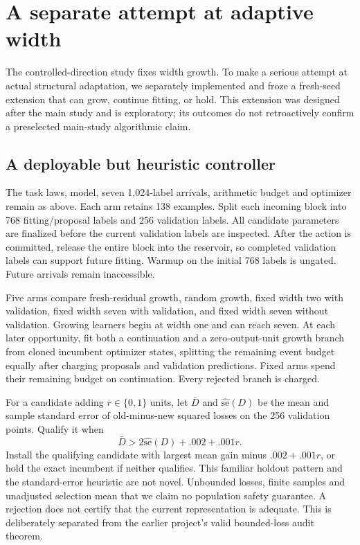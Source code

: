 \section{A separate attempt at adaptive width}
\label{sec:adaptive-extension}

The controlled-direction study fixes width growth. To make a serious attempt
at actual structural adaptation, we separately implemented and froze a
fresh-seed extension that can grow, continue fitting, or hold. This extension
was designed after the main study and is exploratory; its outcomes do not
retroactively confirm a preselected main-study algorithmic claim.

\subsection{A deployable but heuristic controller}
The task laws, model, seven 1,024-label arrivals, arithmetic budget and optimizer
remain as above. Each arm retains 138 examples. Split each incoming block into
768 fitting/proposal labels and 256 validation labels. All candidate parameters
are finalized before the current validation labels are inspected. After the
action is committed, release the entire block into the reservoir, so completed
validation labels can support future fitting. Warmup on the initial 768 labels
is ungated. Future arrivals remain inaccessible.

Five arms compare fresh-residual growth, random growth, fixed width two with
validation, fixed width seven with validation, and fixed width seven without
validation. Growing learners begin at width one and can reach seven. At each
later opportunity, fit both a continuation and a zero-output-unit growth branch
from cloned incumbent optimizer states, splitting the remaining event budget
equally after charging proposals and validation predictions. Fixed arms spend
their remaining budget on continuation. Every rejected branch is charged.

For a candidate adding $r\in\{0,1\}$ units, let $\bar D$ and
$\widehat{\mathrm{se}}(D)$ be the mean and sample standard error of old-minus-new
squared losses on the 256 validation points. Qualify it when
\[
 \bar D>2\widehat{\mathrm{se}}(D)+.002+.001r.
\]
Install the qualifying candidate with largest mean gain minus $.002+.001r$,
or hold the exact incumbent if neither qualifies. This familiar holdout
pattern and the standard-error heuristic are not novel. Unbounded losses,
finite samples and unadjusted selection mean that we claim no population
safety guarantee. A rejection does not certify that the current representation
is adequate. This is deliberately separated from the earlier project's valid
bounded-loss audit theorem.

